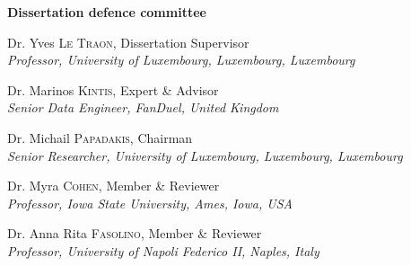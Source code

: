 \begin{adjustwidth*}{1em}{1em}

\noindent
\textbf{\large Dissertation defence committee}

\vspace{0.5cm}
\noindent
Dr. Yves \textsc{Le Traon}, Dissertation Supervisor\\
{\small \emph{Professor, University of Luxembourg, Luxembourg, Luxembourg}}

\vspace{0.3cm}
\noindent
Dr.  Marinos \textsc{Kintis}, Expert \& Advisor\\
{\small \emph{Senior Data Engineer, FanDuel, United Kingdom}}   

\vspace{0.3cm}
\noindent
Dr. Michail \textsc{Papadakis}, Chairman\\
{\small \emph{Senior Researcher, University of Luxembourg, Luxembourg, Luxembourg}}   

\vspace{0.3cm}
\noindent
Dr. Myra \textsc{Cohen}, Member \& Reviewer\\
{\small \emph{Professor, Iowa State University, Ames, Iowa, USA}}

\vspace{0.3cm}
\noindent
Dr. Anna Rita \textsc{Fasolino}, Member \& Reviewer\\
{\small \emph{Professor, University of Napoli Federico II, Naples, Italy}}

\end{adjustwidth*}

\restoregeometry